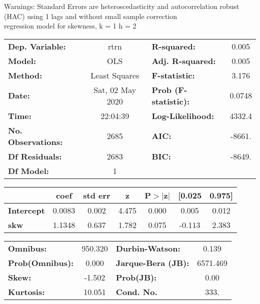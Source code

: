 Warnings: \newline
 [1] Standard Errors are heteroscedasticity and autocorrelation robust (HAC) using 1 lags and without small sample correction\\ 

regression model for skewness, k = 1 h = 2\begin{center}
\begin{tabular}{lclc}
\toprule
\textbf{Dep. Variable:}    &       rtrn       & \textbf{  R-squared:         } &     0.005   \\
\textbf{Model:}            &       OLS        & \textbf{  Adj. R-squared:    } &     0.005   \\
\textbf{Method:}           &  Least Squares   & \textbf{  F-statistic:       } &     3.176   \\
\textbf{Date:}             & Sat, 02 May 2020 & \textbf{  Prob (F-statistic):} &   0.0748    \\
\textbf{Time:}             &     22:04:39     & \textbf{  Log-Likelihood:    } &    4332.4   \\
\textbf{No. Observations:} &        2685      & \textbf{  AIC:               } &    -8661.   \\
\textbf{Df Residuals:}     &        2683      & \textbf{  BIC:               } &    -8649.   \\
\textbf{Df Model:}         &           1      & \textbf{                     } &             \\
\bottomrule
\end{tabular}
\begin{tabular}{lcccccc}
                   & \textbf{coef} & \textbf{std err} & \textbf{z} & \textbf{P$> |$z$|$} & \textbf{[0.025} & \textbf{0.975]}  \\
\midrule
\textbf{Intercept} &       0.0083  &        0.002     &     4.475  &         0.000        &        0.005    &        0.012     \\
\textbf{skw}       &       1.1348  &        0.637     &     1.782  &         0.075        &       -0.113    &        2.383     \\
\bottomrule
\end{tabular}
\begin{tabular}{lclc}
\textbf{Omnibus:}       & 950.320 & \textbf{  Durbin-Watson:     } &    0.139  \\
\textbf{Prob(Omnibus):} &   0.000 & \textbf{  Jarque-Bera (JB):  } & 6571.469  \\
\textbf{Skew:}          &  -1.502 & \textbf{  Prob(JB):          } &     0.00  \\
\textbf{Kurtosis:}      &  10.051 & \textbf{  Cond. No.          } &     333.  \\
\bottomrule
\end{tabular}
\end{center}

